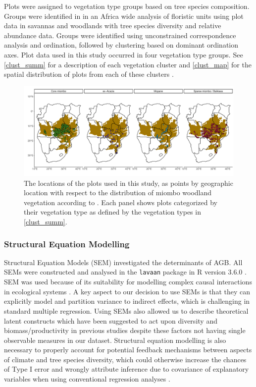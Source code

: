 \documentclass[11pt,a4paper]{article}
\begin{document}
Plots were assigned to vegetation type groups based on tree species composition. Groups were identified in \citet{Fayolle2018} in an Africa wide analysis of floristic units using plot data in savannas and woodlands with tree species diversity and relative abundance data. Groups were identified using unconstrained correspondence analysis and ordination, followed by clustering based on dominant ordination axes. Plot data used in this study occurred in four vegetation type groups. See \autoref{clust_summ} for a description of each vegetation cluster and \autoref{clust_map} for the spatial distribution of plots from each of these clusters .

\begin{landscape}


\begin{figure}[H]
\centering
	\includegraphics[width=1.4\textwidth]{clust_map}
	\caption{The locations of the \nplots{} plots used in this study, as points by geographic location with respect to the distribution of miombo woodland vegetation according to \citet{White1983}. Each panel shows plots categorized by their vegetation type as defined by the vegetation types in \autoref{clust_summ}.}
	\label{clust_map}
\end{figure}
\end{landscape}

\subsubsection*{Structural Equation Modelling}

Structural Equation Models (SEM) investigated the determinants of AGB. All SEMs were constructed and analysed in the \verb|lavaan| package \citep{lavaan} in R version 3.6.0 \citep{R2019}. SEM was used because of its suitability for modelling complex causal interactions in ecological systems \citep{Lee2007}. A key aspect to our decision to use SEMs is that they can explicitly model and partition variance to indirect effects, which is challenging in standard multiple regression. Using SEMs also allowed us to describe theoretical latent constructs which have been suggested to act upon diversity and biomass/productivity in previous studies despite these factors not having single observable measures in our dataset. Structural equation modelling is also necessary to properly account for potential feedback mechanisms between aspects of climate and tree species diversity, which could otherwise increase the chances of Type I error and wrongly attribute inference due to covariance of explanatory variables when using conventional regression analyses \citep{Nachtigall2003}.
\end{document}
